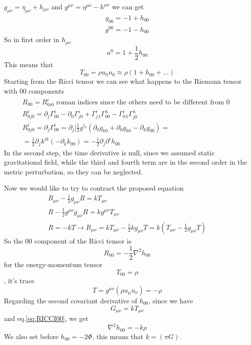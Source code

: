 $g_{\mu \nu } = \eta _{\mu \nu } + h_{\mu \nu }$ and $g^{\mu \nu } = \eta ^{\mu \nu } - h^{\mu \nu }$ we can get
\begin{gather*}
g_{00} = -1 + h_{00} \\
g^{00} = -1 - h_{00}
\end{gather*}
So in first order in $h_{\mu \nu }$
\begin{equation}
u^{0} = 1+ \frac{1}{2}h_{00}
\end{equation}
This means that
\begin{equation}
T_{00} = \rho u_{0}u_{0} \approx \rho \left( 1+ h_{00} + \ldots  \right)	
\end{equation}
Starting from the Ricci tensor we can see what happens to the Riemann tensor with 00 components
\begin{gather*}
R_{00} = R^{i}_{0i0}  \text{ roman indices since the others need to be different from 0 }\\
R^{i}_{0j0} = \partial_{j}\Gamma ^{i}_{00} - \partial_{0}\Gamma ^{i}_{j0} + \Gamma ^{i}_{j\lambda }\Gamma ^{\lambda }_{00} - \Gamma ^{i}_{0\lambda }\Gamma ^{\lambda }_{j0} \\
R^{i}_{0j0} = \partial_{j}\Gamma ^{i}_{00} = \partial_{j} [\frac{1}{2} g^{i_k} \left( \partial_{0}g_{k0}+ \partial_{0}g_{k0}- \partial_{k}g_{00} \right) = \\
= \frac{1}{2} \partial_{j}k^{ik} \left( -\partial_{k}k_{00} \right) = - \frac{1}{2} \partial_{j} \partial^{i}h_{00}
\end{gather*}
In the second step, the time derivative is null, since we assumed static gravitational field, while the third and fourth term are in the second order in the metric perturbation, so they can be neglected.\par
Now we would like to try to contract the proposed equation
\begin{gather*}
R_{\mu \nu } - \frac{1}{2} g_{\mu \nu } R = k T_{\mu \nu } \\
R - \frac{1}{2} g^{\mu \nu } g_{\mu \nu }R = k g^{\mu \nu }T_{\mu \nu }\\
R = -kT
\to  R_{\mu \nu } = kT_{\mu \nu } - \frac{1}{2} kg_{\mu \nu }T = k \left( T_{\mu \nu } - \frac{1}{2} g_{\mu \nu } T \right)
\end{gather*}
So the 00 component of the Ricci tensor is 
\begin{equation}\label{eq:RICCI00}
R_{00} = -\frac{1}{2} \nabla ^{2}h_{00}
\end{equation}
for the energy-momentum tensor
\begin{equation}
T_{00} = \rho 
\end{equation},
it's trace
\begin{equation}
T = g^{\mu \nu } \left( \rho u_{\mu } u_{\nu }\right) = -\rho 
\end{equation}
Regarding the second covariant derivative of $h_{00}$, since we have
\[
	G_{\mu \nu } = k T_{\mu \nu }
\]
and eq.\ref{eq:RICCI00}, we get
\begin{equation}
\nabla ^{2}h_{00} = -k\rho 
\end{equation}
We also set before $h_{00} = -2 \Phi $, this means that $k = \left( \pi G \right)$.\par


